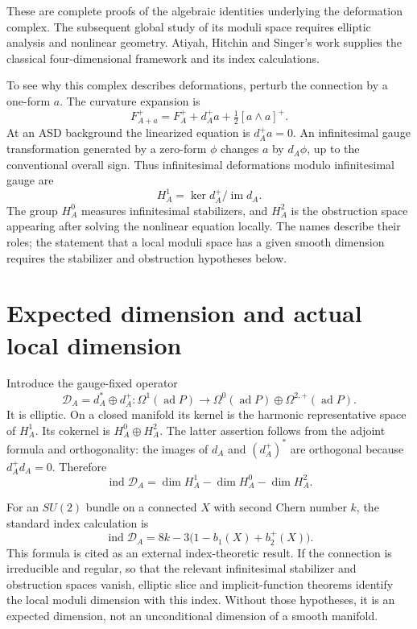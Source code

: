 These are complete proofs of the algebraic identities underlying the deformation complex. The subsequent global study of its moduli space requires elliptic analysis and nonlinear geometry. Atiyah, Hitchin and Singer's work supplies the classical four-dimensional framework and its index calculations.\cite{v2AHS1978}

To see why this complex describes deformations, perturb the connection by a one-form $a$. The curvature expansion is
\[
F_{A+a}^+=F_A^++d_A^+a+\tfrac12[a\wedge a]^+.
\]
At an ASD background the linearized equation is $d_A^+a=0$. An infinitesimal gauge transformation generated by a zero-form $\phi$ changes $a$ by $d_A\phi$, up to the conventional overall sign. Thus infinitesimal deformations modulo infinitesimal gauge are
\[
H_A^1=\ker d_A^+/\operatorname{im}d_A.
\]
The group $H_A^0$ measures infinitesimal stabilizers, and $H_A^2$ is the obstruction space appearing after solving the nonlinear equation locally. The names describe their roles; the statement that a local moduli space has a given smooth dimension requires the stabilizer and obstruction hypotheses below.

\section{Expected dimension and actual local dimension}

Introduce the gauge-fixed operator
\[
\mathcal D_A=d_A^*\oplus d_A^+:
\Omega^1(\operatorname{ad}P)\to
\Omega^0(\operatorname{ad}P)\oplus\Omega^{2,+}(\operatorname{ad}P).
\]
It is elliptic. On a closed manifold its kernel is the harmonic representative space of $H_A^1$. Its cokernel is $H_A^0\oplus H_A^2$. The latter assertion follows from the adjoint formula and orthogonality: the images of $d_A$ and $(d_A^+)^*$ are orthogonal because $d_A^+d_A=0$. Therefore
\[
\operatorname{ind}\mathcal D_A
=\dim H_A^1-\dim H_A^0-\dim H_A^2.
\]

For an $SU(2)$ bundle on a connected $X$ with second Chern number $k$, the standard index calculation is
\[
\operatorname{ind}\mathcal D_A
=8k-3\bigl(1-b_1(X)+b_2^+(X)\bigr).
\]
This formula is cited as an external index-theoretic result. If the connection is irreducible and regular, so that the relevant infinitesimal stabilizer and obstruction spaces vanish, elliptic slice and implicit-function theorems identify the local moduli dimension with this index. Without those hypotheses, it is an expected dimension, not an unconditional dimension of a smooth manifold.\cite{v2AHS1978}


